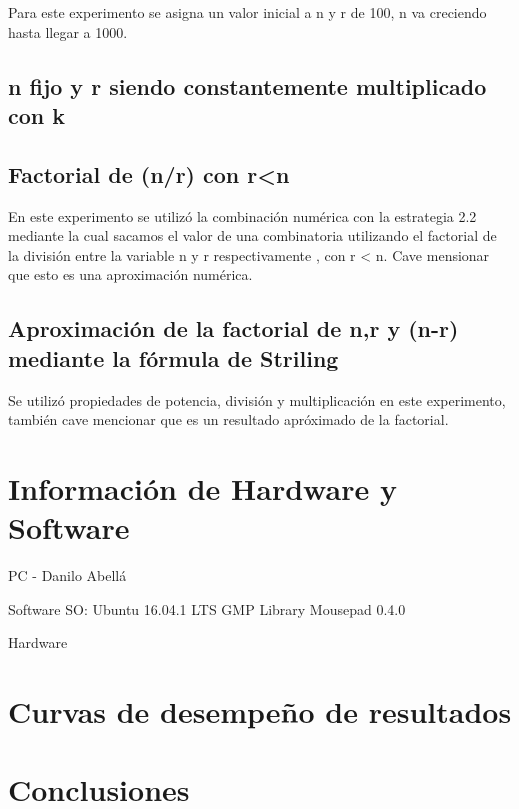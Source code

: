 \documentclass[12pt,letterpaper]{scrartcl}
\begin{document}
Para este experimento se asigna un valor inicial a n y r de 100, n  va creciendo hasta llegar a 1000.

\subsection{n fijo y r siendo constantemente multiplicado con k}

\subsection{Factorial de (n/r) con r<n}

En este experimento se utilizó la combinación numérica con la estrategia 2.2 mediante la cual sacamos el valor de una combinatoria utilizando el factorial de la división entre la variable n y r respectivamente , con r < n.
Cave mensionar que esto es una aproximación numérica.

\subsection{Aproximación de la factorial de n,r y (n-r) mediante la fórmula de Striling}

Se utilizó propiedades de potencia, división y multiplicación en este experimento, también cave mencionar que es un resultado apróximado de la factorial.

\section{Información de Hardware y Software}

PC - Danilo Abellá

Software
SO: Ubuntu 16.04.1 LTS
GMP Library
Mousepad 0.4.0

Hardware



\section{Curvas de desempeño de resultados}

\section{Conclusiones}
\end{document}
